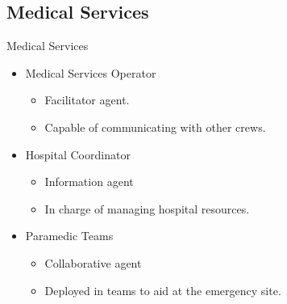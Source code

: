 \subsection{Medical Services}
\begin{frame}{Medical Services}
    \begin{itemize}
        \item Medical Services Operator
        \begin{itemize}
            \item \alert{Facilitator} agent.
            \item Capable of \alert{communicating} with other crews.
        \end{itemize}
        \item Hospital Coordinator
        \begin{itemize}
            \item \alert{Information} agent
            \item In charge of \alert{managing} hospital \alert{resources}.
        \end{itemize}
        \item Paramedic Teams
        \begin{itemize}
            \item \alert{Collaborative} agent
            \item Deployed in \alert{teams} to aid at the emergency site.
        \end{itemize}
    \end{itemize}
\end{frame} 